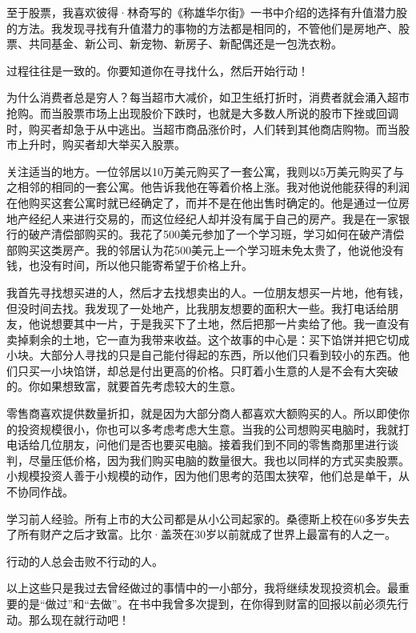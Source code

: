 至于股票，我喜欢彼得·林奇写的《称雄华尔街》一书中介绍的选择有升值潜力股的方法。我发现寻找有升值潜力的事物的方法都是相同的，不管他们是房地产、股票、共同基金、新公司、新宠物、新房子、新配偶还是一包洗衣粉。

过程往往是一致的。你要知道你在寻找什么，然后开始行动！

为什么消费者总是穷人？每当超市大减价，如卫生纸打折时，消费者就会涌入超市抢购。而当股票市场上出现股价下跌时，也就是大多数人所说的股市下挫或回调时，购买者却急于从中逃出。当超市商品涨价时，人们转到其他商店购物。而当股市上升时，购买者却大举买入股票。

关注适当的地方。一位邻居以10万美元购买了一套公寓，我则以5万美元购买了与之相邻的相同的一套公寓。他告诉我他在等着价格上涨。我对他说他能获得的利润在他购买这套公寓时就已经确定了，而并不是在他出售时确定的。他是通过一位房地产经纪人来进行交易的，而这位经纪人却并没有属于自己的房产。我是在一家银行的破产清偿部购买的。我花了500美元参加了一个学习班，学习如何在破产清偿部购买这类房产。我的邻居认为花500美元上一个学习班未免太贵了，他说他没有钱，也没有时间，所以他只能寄希望于价格上升。

我首先寻找想买进的人，然后才去找想卖出的人。一位朋友想买一片地，他有钱，但没时间去找。我发现了一处地产，比我朋友想要的面积大一些。我打电话给朋友，他说想要其中一片，于是我买下了土地，然后把那一片卖给了他。我一直没有卖掉剩余的土地，它一直为我带来收益。这个故事的中心是：买下馅饼并把它切成小块。大部分人寻找的只是自己能付得起的东西，所以他们只看到较小的东西。他们只买一小块馅饼，却总是付出更高的价格。只盯着小生意的人是不会有大突破的。你如果想致富，就要首先考虑较大的生意。

零售商喜欢提供数量折扣，就是因为大部分商人都喜欢大额购买的人。所以即使你的投资规模很小，你也可以多考虑考虑大生意。当我的公司想购买电脑时，我就打电话给几位朋友，问他们是否也要买电脑。接着我们到不同的零售商那里进行谈判，尽量压低价格，因为我们购买电脑的数量很大。我也以同样的方式买卖股票。小规模投资人善于小规模的动作，因为他们思考的范围太狭窄，他们总是单干，从不协同作战。

学习前人经验。所有上市的大公司都是从小公司起家的。桑德斯上校在60多岁失去了所有财产之后才致富。比尔·盖茨在30岁以前就成了世界上最富有的人之一。

行动的人总会击败不行动的人。

以上这些只是我过去曾经做过的事情中的一小部分，我将继续发现投资机会。最重要的是“做过”和“去做”。在书中我曾多次提到，在你得到财富的回报以前必须先行动。那么现在就行动吧！
